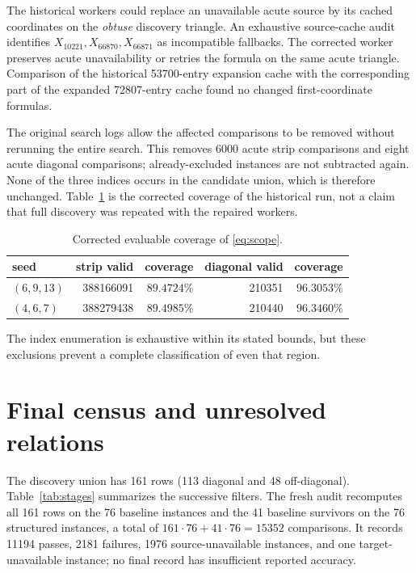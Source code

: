 \documentclass[11pt]{article}
\begin{document}
The historical workers could replace an unavailable acute source by its
cached coordinates on the \emph{obtuse} discovery triangle.  An exhaustive
source-cache audit identifies $X_{10221},X_{66870},X_{66871}$ as incompatible
fallbacks.  The corrected worker preserves acute unavailability or retries
the formula on the same acute triangle.  Comparison of the historical
53700-entry expansion cache with the corresponding part of the expanded
72807-entry cache found no changed first-coordinate formulas.

The original search logs allow the affected comparisons to be removed
without rerunning the entire search.  This removes 6000 acute strip
comparisons and eight acute diagonal comparisons; already-excluded
instances are not subtracted again.  None of the three indices occurs
in the candidate union, which is therefore unchanged.
Table~\ref{tab:coverage} is the corrected coverage of the historical run,
not a claim that full discovery was repeated with the repaired workers.

\begin{table}[ht]
\centering
\caption{Corrected evaluable coverage of \eqref{eq:scope}.}
\label{tab:coverage}
\small
\begin{tabular}{@{}lrrrr@{}}
\toprule
seed & strip valid & coverage & diagonal valid & coverage\\
\midrule
$(6,9,13)$ & 388166091 & $89.4724\%$ & 210351 & $96.3053\%$\\
$(4,6,7)$  & 388279438 & $89.4985\%$ & 210440 & $96.3460\%$\\
\bottomrule
\end{tabular}
\end{table}
The index enumeration is exhaustive within its stated bounds, but these
exclusions prevent a complete classification of even that region.

\section{Final census and unresolved relations}
\label{sec:generic-stress}

The discovery union has 161 rows (113 diagonal and 48 off-diagonal).
Table~\ref{tab:stages} summarizes the successive filters.
The fresh audit recomputes all 161 rows on the 76 baseline instances and
the 41 baseline survivors on the 76 structured instances, a total of
$161\cdot76+41\cdot76=15352$ comparisons.  It records 11194 passes,
2181 failures, 1976 source-unavailable instances, and one target-unavailable
instance; no final record has insufficient reported accuracy.
\end{document}
